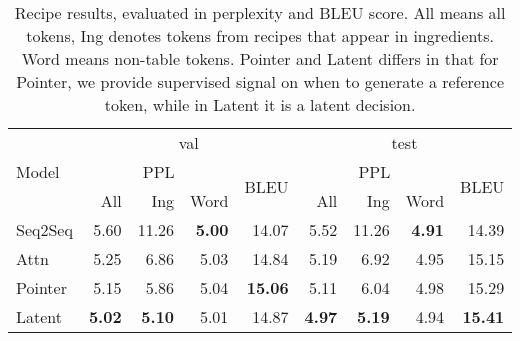 \documentclass[11pt,letterpaper]{article}
\begin{document}
\begin{table*}[!thbp]
\begin{small}
\centering
\begin{tabular}{l r r r r | r r r r}
  \toprule
  \multirow{3}{*}{Model} & \multicolumn{4}{c}{val} &  \multicolumn{4}{c}{test} \\
  \cline{2-9}
                         & \multicolumn{3}{c}{PPL} & \multirow{2}{*}{BLEU} & \multicolumn{3}{c}{PPL} &
                                                                                                       \multirow{2}{*}{BLEU} \\
  \cline{2-4} \cline{6-8}
                         & All & Ing & Word & & All & Ing & Word & \\
  \hline
  Seq2Seq & 5.60 & 11.26 & {\bf 5.00} & 14.07 & 5.52 & 11.26  & {\bf 4.91} & 14.39 \\
  Attn & 5.25 & 6.86 & 5.03 & 14.84 & 5.19 & 6.92 & 4.95 & 15.15 \\
  Pointer & 5.15 & 5.86 & 5.04 & {\bf 15.06} & 5.11 & 6.04 & 4.98 & 15.29 \\
  Latent & {\bf 5.02} & {\bf 5.10} & 5.01 & 14.87 & {\bf 4.97} & {\bf
                                                                 5.19} &

                                                                         4.94
                               & {\bf 15.41} \\
  \bottomrule
\end{tabular}
\caption{Recipe results, evaluated in perplexity and BLEU score. All means all tokens,
Ing denotes tokens from recipes that appear in ingredients. Word means non-table tokens.
Pointer and Latent differs in that for Pointer, we provide supervised signal on when 
to generate a reference token, while in Latent it is a latent decision.}
\label{tab:recipe}
\end{small}
\end{table*}
\end{document}
